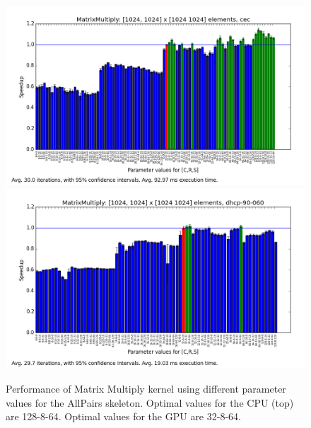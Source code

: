 \begin{figure}[h]
\includegraphics[width=\textwidth]{img/MatrixMultiply-1024-1024-1024-cec.png}
\includegraphics[width=\textwidth]{img/MatrixMultiply-1024-1024-1024-dhcp-90-060.png}
\caption{Performance of Matrix Multiply kernel using different
  parameter values for the AllPairs skeleton. Optimal values for the
  CPU (top) are 128-8-64. Optimal values for the GPU are 32-8-64.}
\label{fig:mm}
\end{figure}

